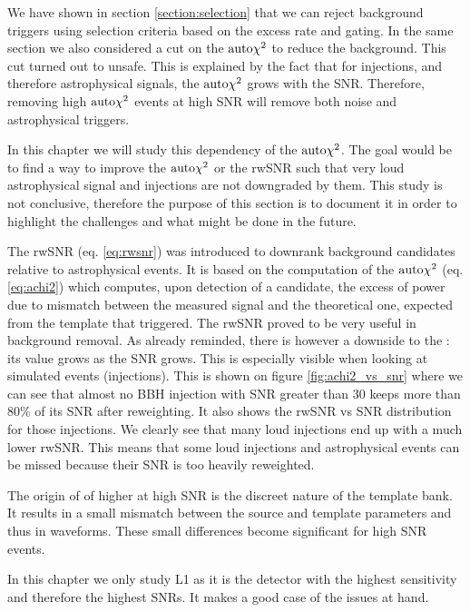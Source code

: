 
We have shown in section \ref{section:selection} that we can reject background triggers using selection criteria based on the excess rate and gating.
In the same section we also considered a cut on the $\textrm{auto$\chi^2$}$ to reduce the background.
This cut turned out to unsafe.
This is explained by the fact that for injections, and therefore astrophysical signals, the $\textrm{auto$\chi^2$}$ grows with the SNR.
Therefore, removing high $\textrm{auto$\chi^2$}$ events at high SNR will remove both noise and astrophysical triggers.

In this chapter we will study this dependency of the $\textrm{auto$\chi^2$}$.
The goal would be to find a way to improve the $\textrm{auto$\chi^2$}$ or the rwSNR such that very loud astrophysical signal and injections are not downgraded by them.
This study is not conclusive, therefore the purpose of this section is to document it in order to highlight the challenges and what might be done in the future.


\label{sec:improve_achi2}

The rwSNR (eq. \ref{eq:rwsnr}) was introduced to downrank background candidates relative to astrophysical events.
It is based on the computation of the $\textrm{auto$\chi^2$}$ (eq. \ref{eq:achi2})  which computes, upon detection of a candidate, the excess of power due to mismatch between the measured signal and the theoretical one, expected from the template that triggered.
The rwSNR proved to be very useful in background removal.
As already reminded, there is however a downside to the \achi: its value grows as the SNR grows.
This is especially visible when looking at simulated events (injections).
This is shown on figure \ref{fig:achi2_vs_snr} where we can see that almost no BBH injection with SNR greater than 30 keeps more than 80\% of its SNR after reweighting.
It also shows the rwSNR vs SNR distribution for those injections.
We clearly see that many loud injections end up with a much lower rwSNR.
This means that some loud injections and astrophysical events can be missed because their SNR is too heavily reweighted.

The origin of of higher \achi at high SNR is the discreet nature of the template bank.
It results in a small mismatch between the source and template parameters and thus in waveforms.
These small differences become significant for high SNR events.

In this chapter we only study L1 as it is the detector with the highest sensitivity and therefore the highest SNRs.
It makes a good case of the issues at hand.

